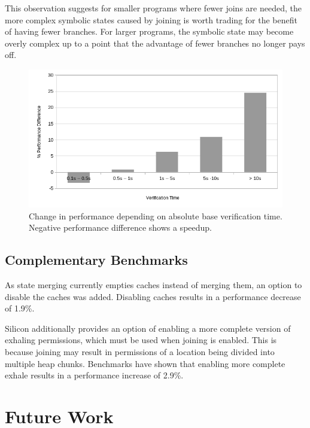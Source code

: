 \documentclass[11pt]{article}
\begin{document}
    This observation suggests for smaller programs where fewer joins are needed, the more complex symbolic
    states caused by joining is worth trading for the benefit of having fewer branches. For
    larger programs, the symbolic state may become overly complex up to a point that the advantage of
    fewer branches no longer pays off.

    \begin{figure}[H]
        \includegraphics[width=\linewidth]{performance-change-vs-verification-time.png}
        \caption{
            Change in performance depending on absolute base verification time. Negative performance difference shows a speedup.
        }
        \label{fig:state-merges}
    \end{figure}

    \subsection{Complementary Benchmarks}

    As state merging currently empties caches instead of merging them, an option to disable the caches
    was added. Disabling caches results in a performance decrease of 1.9\%.

    Silicon additionally provides an option of enabling a more complete version of exhaling permissions,
    which must be used when joining is enabled. This is because joining may result in permissions of a 
    location being divided into multiple heap chunks. Benchmarks have shown that enabling more complete 
    exhale results in a performance increase of 2.9\%.

    \newpage
    \section{Future Work}

    

    \newpage
    \printbibliography
    
\end{document}
